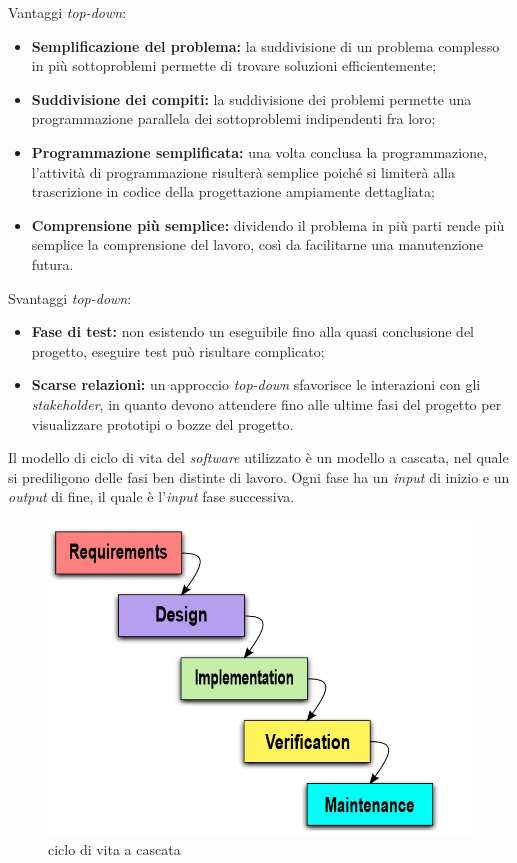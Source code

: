 Vantaggi \textit{top-down}:
\begin{itemize}
\item \textbf{Semplificazione del problema:} la suddivisione di un problema complesso in più sottoproblemi permette di trovare soluzioni efficientemente;
\item \textbf{Suddivisione dei compiti:} la suddivisione dei problemi permette una programmazione parallela dei sottoproblemi indipendenti fra loro;
\item \textbf{Programmazione semplificata:} una volta conclusa la programmazione, l'attività di programmazione risulterà semplice poiché si limiterà alla trascrizione in codice della progettazione ampiamente dettagliata;
\item \textbf{Comprensione più semplice:} dividendo il problema in più parti rende più semplice la comprensione del lavoro, così da facilitarne una manutenzione futura.

\end{itemize}
 
Svantaggi \textit{top-down}:

\begin{itemize}

\item \textbf{Fase di test:} non esistendo un eseguibile fino alla quasi conclusione del progetto, eseguire test può risultare complicato;
\item \textbf{Scarse relazioni:} un approccio \textit{top-down} sfavorisce le interazioni con gli \textit{stakeholder}, in quanto devono attendere fino alle ultime fasi del progetto per visualizzare prototipi o bozze del progetto.
\end{itemize}

Il modello di ciclo di vita del \textit{software} utilizzato è un modello a cascata, nel quale si prediligono delle fasi ben distinte di lavoro. Ogni fase ha un \textit{input} di inizio e un \textit{output} di fine, il quale è l'\textit{input} fase successiva.

\begin{figure}[htbp]
	\includegraphics[scale=0.3]{./capitoli/capitolo1/img/cascata}
	\caption{ciclo di vita a cascata}

\end{figure}


